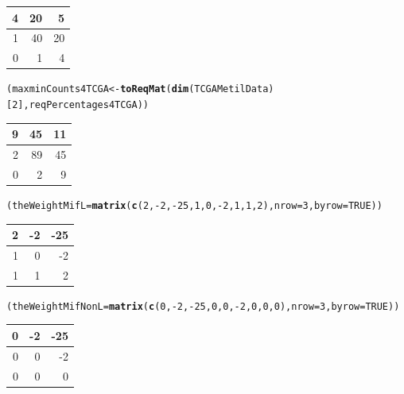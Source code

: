 \documentclass[a4paper,10pt]{article}\usepackage[]{graphicx}\usepackage[]{color}
\makeatletter
\newcommand{\hlnum}[1]{\textcolor[rgb]{0.686,0.059,0.569}{#1}}%
\newcommand{\hlopt}[1]{\textcolor[rgb]{0,0,0}{#1}}%
\newcommand{\hlstd}[1]{\textcolor[rgb]{0.345,0.345,0.345}{#1}}%
\newcommand{\hlkwb}[1]{\textcolor[rgb]{0.69,0.353,0.396}{#1}}%
\newcommand{\hlkwc}[1]{\textcolor[rgb]{0.333,0.667,0.333}{#1}}%
\newcommand{\hlkwd}[1]{\textcolor[rgb]{0.737,0.353,0.396}{\textbf{#1}}}%
\newenvironment{kframe}{%
 \def\at@end@of@kframe{}%
 \ifinner\ifhmode%
  \def\at@end@of@kframe{\end{minipage}}%
  \begin{minipage}{\columnwidth}%
 \fi\fi%
 \def\FrameCommand##1{\hskip\@totalleftmargin \hskip-\fboxsep
 \colorbox{shadecolor}{##1}\hskip-\fboxsep
     \hskip-\linewidth \hskip-\@totalleftmargin \hskip\columnwidth}%
 \MakeFramed {\advance\hsize-\width
   \@totalleftmargin\z@ \linewidth\hsize
   \@setminipage}}%
 {\par\unskip\endMakeFramed%
 \at@end@of@kframe}
\newenvironment{knitrout}{}{} %
\makeatother
\begin{document}
\begin{knitrout}
\begin{tabular}{r|r|r}
\hline
4 & 20 & 5\\
\hline
1 & 40 & 20\\
\hline
0 & 1 & 4\\
\hline
\end{tabular}\begin{kframe}\begin{alltt}
\hlstd{(maxminCounts4TCGA} \hlkwb{<-} \hlkwd{toReqMat}\hlstd{(}\hlkwd{dim}\hlstd{(TCGAMetilData)[}\hlnum{2}\hlstd{], reqPercentages4TCGA))}
\end{alltt}
\end{kframe}


\begin{tabular}{r|r|r}
\hline
9 & 45 & 11\\
\hline
2 & 89 & 45\\
\hline
0 & 2 & 9\\
\hline
\end{tabular}\begin{kframe}\begin{alltt}
\hlstd{(theWeightMifL}\hlkwb{=}\hlkwd{matrix} \hlstd{(}\hlkwd{c}\hlstd{(}\hlnum{2}\hlstd{,}\hlopt{-}\hlnum{2}\hlstd{,}\hlopt{-}\hlnum{25}\hlstd{,}\hlnum{1}\hlstd{,}\hlnum{0}\hlstd{,}\hlopt{-}\hlnum{2}\hlstd{,}\hlnum{1}\hlstd{,}\hlnum{1}\hlstd{,}\hlnum{2}\hlstd{),} \hlkwc{nrow}\hlstd{=}\hlnum{3}\hlstd{,} \hlkwc{byrow}\hlstd{=}\hlnum{TRUE}\hlstd{))}
\end{alltt}
\end{kframe}


\begin{tabular}{r|r|r}
\hline
2 & -2 & -25\\
\hline
1 & 0 & -2\\
\hline
1 & 1 & 2\\
\hline
\end{tabular}\begin{kframe}\begin{alltt}
\hlstd{(theWeightMifNonL}\hlkwb{=}\hlkwd{matrix} \hlstd{(}\hlkwd{c}\hlstd{(}\hlnum{0}\hlstd{,}\hlopt{-}\hlnum{2}\hlstd{,}\hlopt{-}\hlnum{25}\hlstd{,}\hlnum{0}\hlstd{,}\hlnum{0}\hlstd{,}\hlopt{-}\hlnum{2}\hlstd{,}\hlnum{0}\hlstd{,}\hlnum{0}\hlstd{,}\hlnum{0}\hlstd{),} \hlkwc{nrow}\hlstd{=}\hlnum{3}\hlstd{,} \hlkwc{byrow}\hlstd{=}\hlnum{TRUE}\hlstd{))}
\end{alltt}
\end{kframe}


\begin{tabular}{r|r|r}
\hline
0 & -2 & -25\\
\hline
0 & 0 & -2\\
\hline
0 & 0 & 0\\
\hline
\end{tabular}
\end{knitrout}
\end{document}
